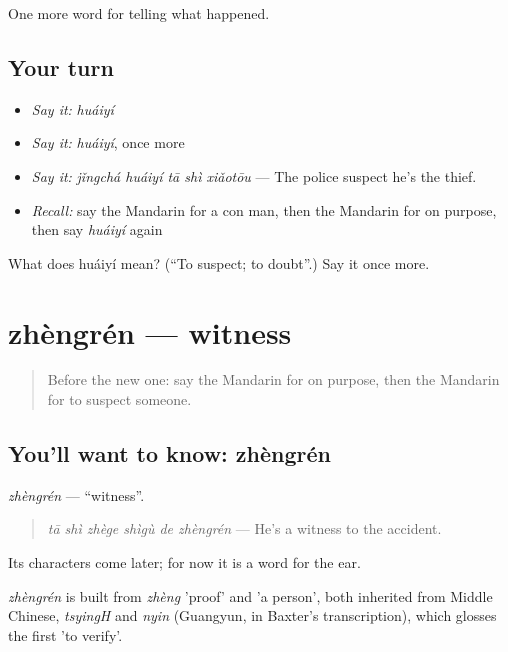 \begin{grammarlens}[title={What you've built}]
One more word for telling what happened.
\end{grammarlens}

\subsection*{Your turn}
\begin{itemize}
\raggedright
  \item \emph{Say it:} \emph{huáiyí}
  \item \emph{Say it:} \emph{huáiyí}, once more
  \item \emph{Say it:} \emph{jǐngchá huáiyí tā shì xiǎotōu} — The police suspect he's the thief.
  \item \emph{Recall:} say the Mandarin for a con man, then the Mandarin for on purpose, then say \emph{huáiyí} again
\end{itemize}

\begin{tcolorbox}[breakable,colback=teal!4,colframe=teal!35!black,title={Before you move on}]
What does huáiyí mean? (\textquotedblleft{}To suspect; to doubt\textquotedblright{}.) Say it once more.
\end{tcolorbox}
\section[zhèngrén]{zhèngrén — witness}

\label{lesson:ZH-C310-zhengren}



\begin{quote}
Before the new one: say the Mandarin for on purpose, then the Mandarin for to suspect someone.
\end{quote}

\subsection*{You'll want to know: zhèngrén}
\emph{zhèngrén} — \textquotedblleft{}witness\textquotedblright{}.

\begin{quote}
\emph{tā shì zhège shìgù de zhèngrén} — He's a witness to the accident.
\end{quote}

Its characters come later; for now it is a word for the ear.

\begin{cousinweb}
\emph{zhèngrén} is built from \emph{zhèng} 'proof' and  'a person', both inherited from Middle Chinese, \emph{tsyingH} and \emph{nyin} (Guangyun, in Baxter's transcription), which glosses the first 'to verify'.
\end{cousinweb}

